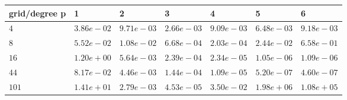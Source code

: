 \begin{tabular}{lllllll}
\hline
 grid/degree p   & 1          & 2          & 3          & 4          & 5          & 6          \\
\hline
 $4$             & $3.86e-02$ & $9.71e-03$ & $2.66e-03$ & $9.09e-03$ & $6.48e-03$ & $9.18e-03$ \\
 $8$             & $5.52e-02$ & $1.08e-02$ & $6.68e-04$ & $2.03e-04$ & $2.44e-02$ & $6.58e-01$ \\
 $16$            & $1.20e+00$ & $5.64e-03$ & $2.39e-04$ & $2.34e-05$ & $1.05e-06$ & $1.09e-06$ \\
 $44$            & $8.17e-02$ & $4.46e-03$ & $1.44e-04$ & $1.09e-05$ & $5.20e-07$ & $4.60e-07$ \\
 $101$           & $1.41e+01$ & $2.79e-03$ & $4.53e-05$ & $3.50e-02$ & $1.98e+06$ & $1.08e+05$ \\
\hline
\end{tabular}